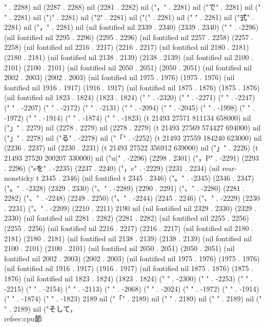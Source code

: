 " . 2288) nil (2287 . 2288) nil (2281 . 2282) nil ("，" . 2281) nil ("で" . 2281) nil (" " . 2281) nil (")" . 2281) nil ("2" . 2281) nil ("(" . 2281) nil (" " . 2281) nil ("式" . 2281) nil ("，" . 2281) nil (nil fontified nil 2339 . 2340) (2339 . 2340) (" " . -2296) (nil fontified nil 2295 . 2296) (2295 . 2296) (nil fontified nil 2257 . 2258) (2257 . 2258) (nil fontified nil 2216 . 2217) (2216 . 2217) (nil fontified nil 2180 . 2181) (2180 . 2181) (nil fontified nil 2138 . 2139) (2138 . 2139) (nil fontified nil 2100 . 2101) (2100 . 2101) (nil fontified nil 2050 . 2051) (2050 . 2051) (nil fontified nil 2002 . 2003) (2002 . 2003) (nil fontified nil 1975 . 1976) (1975 . 1976) (nil fontified nil 1916 . 1917) (1916 . 1917) (nil fontified nil 1875 . 1876) (1875 . 1876) (nil fontified nil 1823 . 1824) (1823 . 1824) ("
" . -2320) ("
" . -2271) ("
" . -2247) ("
" . -2207) ("
" . -2172) ("
" . -2131) ("
" . -2094) ("
" . -2045) ("
" . -1998) ("
" . -1972) ("
" . -1914) ("
" . -1874) ("
" . -1823) (t 21493 27571 811134 658000) nil ("」" . 2279) nil (2278 . 2279) nil (2278 . 2279) (t 21493 27569 574427 694000) nil ("」" . 2278) nil ("る" . -2278) nil ("「" . -2252) (t 21493 27559 184240 623000) nil (2236 . 2237) nil (2230 . 2231) (t 21493 27522 356912 639000) nil ("」" . 2226) (t 21493 27520 200207 330000) nil ("u(" . -2296) (2298 . 2301) ("，P" . -2291) (2293 . 2296) ("sを" . -2235) (2237 . 2240) ("，c" . -2229) (2231 . 2234) (nil rear-nonsticky t 2345 . 2346) (nil fontified t 2345 . 2346) ("。" . -2345) (2346 . 2347) ("。" . -2328) (2329 . 2330) ("、" . -2289) (2290 . 2291) ("、" . -2280) (2281 . 2282) ("、" . -2248) (2249 . 2250) ("、" . -2244) (2245 . 2246) ("、" . -2229) (2230 . 2231) ("、" . -2209) (2210 . 2211) 2190 nil (nil fontified nil 2329 . 2330) (2329 . 2330) (nil fontified nil 2281 . 2282) (2281 . 2282) (nil fontified nil 2255 . 2256) (2255 . 2256) (nil fontified nil 2216 . 2217) (2216 . 2217) (nil fontified nil 2180 . 2181) (2180 . 2181) (nil fontified nil 2138 . 2139) (2138 . 2139) (nil fontified nil 2100 . 2101) (2100 . 2101) (nil fontified nil 2050 . 2051) (2050 . 2051) (nil fontified nil 2002 . 2003) (2002 . 2003) (nil fontified nil 1975 . 1976) (1975 . 1976) (nil fontified nil 1916 . 1917) (1916 . 1917) (nil fontified nil 1875 . 1876) (1875 . 1876) (nil fontified nil 1823 . 1824) (1823 . 1824) ("
" . -2300) ("
" . -2253) ("
" . -2215) ("
" . -2154) ("
" . -2113) ("
" . -2068) ("
" . -2024) ("
" . -1972) ("
" . -1914) ("
" . -1874) ("
" . -1823) 2189 nil ("「" . 2189) nil ("
" . 2189) nil ("
" . 2189) nil ("
" . 2189) nil ("そして，~\\ref{sec:cpu}節
